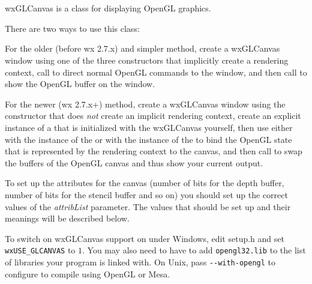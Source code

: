 \section{}\label{wxglcanvas}

wxGLCanvas is a class for displaying OpenGL graphics.

There are two ways to use this class:

For the older (before wx 2.7.x) and simpler method, create a wxGLCanvas window using one of the three
constructors that implicitly create a rendering context, call  
to direct normal OpenGL commands to the window, and then call  
to show the OpenGL buffer on the window.

For the newer (wx 2.7.x+) method, create a wxGLCanvas window using the constructor that does \emph{not} create an implicit rendering context,
create an explicit instance of a  that is initialized with the wxGLCanvas yourself,
then use either  with the instance of the 
or  with the instance of the 
to bind the OpenGL state that is represented by the rendering context to the canvas, and then call
 to swap the buffers of the OpenGL canvas and thus show your current output.

To set up the attributes for the canvas (number of bits for the depth buffer,
number of bits for the stencil buffer and so on) you should set up the correct values of
the {\it attribList} parameter. The values that should be set up and their meanings will be described below.

To switch on wxGLCanvas support on under Windows, edit setup.h and set
{\tt wxUSE\_GLCANVAS} to $1$. You may also need to have to add
{\tt opengl32.lib} to the list of libraries your program is linked with. On
Unix, pass \verb=--with-opengl= to configure to compile using OpenGL or Mesa.


\\
\\


